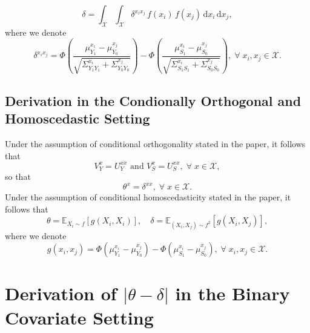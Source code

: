 \documentclass[referee,usenatbib]{biom}
\newcommand{\E}{\mathbb{E}}
\begin{document}
\begin{equation*}
    \delta = \int_{\mathcal{X}} \int_{\mathcal{X}} \delta^{x_{i} x_{j}} \, f(x_{i}) \, f(x_{j}) \, \text{d}x_{i} \, \text{d}x_{j},
\end{equation*}
where we denote
\begin{equation*}
    \delta^{x_{i} x_{j}} = %
    \Phi \left( \frac{\mu^{x_{i}}_{Y_{1}} - \mu^{x_{j}}_{Y_{0}}}{\sqrt{\Sigma^{x_{i}}_{Y_{1} Y_{1}} + \Sigma^{x_{j}}_{Y_{0} Y_{0}}}} \right) - \Phi \left( \frac{\mu^{x_{i}}_{S_{1}} - \mu^{x_{j}}_{S_{0}}}{\sqrt{\Sigma^{x_{i}}_{S_{1} S_{1}} + \Sigma^{x_{j}}_{S_{0} S_{0}}}} \right), \; \forall \; x_i, x_j \in \mathcal{X}.
\end{equation*}

\subsection{Derivation in the Condionally Orthogonal and Homoscedastic Setting}

Under the assumption of conditional orthogonality stated in the paper, it follows that
\begin{equation*}
    V^{x}_{Y} = U^{xx}_{Y} \text{ and } V^{x}_{S} = U^{xx}_{S}, \; \forall \; x \in \mathcal{X},
\end{equation*}
so that
\begin{equation}
\label{eq:equivalence_theta_x_delta_xx}
    \theta^{x} = \delta^{x x}, \; \forall \; x \in \mathcal{X}.
\end{equation}
Under the assumption of conditional homoscedasticity stated in the paper, it follows that
\begin{equation*}
    \theta = \E_{X_{i} \sim f} \!\left[ g(X_{i}, X_{i}) \right], \quad \delta = \E_{(X_{i}, X_{j}) \sim f^{2}} \!\left[ g(X_{i}, X_{j}) \right],
\end{equation*}
where we denote
\begin{equation}
\label{eq:g_definition}
    g(x_{i}, x_{j}) = \Phi \left( \mu^{x_{i}}_{Y_{1}} - \mu^{x_{j}}_{Y_{0}} \right) - \Phi \left( \mu^{x_{i}}_{S_{1}} - \mu^{x_{j}}_{S_{0}} \right), \; \forall \; x_{i}, x_{j} \in \mathcal{X}.
\end{equation}

\section{Derivation of \texorpdfstring{\(|\theta - \delta|\)}{|theta - delta|} in the Binary Covariate Setting}
\label{app:binary_covariate_derivation}
\end{document}
